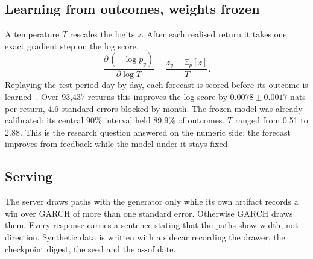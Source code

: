 \documentclass[conference]{IEEEtran}
\begin{document}
\subsection{Learning from outcomes, weights frozen}
\label{sec:online}
A temperature $T$ rescales the logits $z$. After each realised return it takes one exact gradient
step on the log score,
\begin{equation}
\frac{\partial\,(-\log p_y)}{\partial \log T} = \frac{z_y - \mathbb{E}_p[z]}{T}.
\end{equation}
Replaying the test period day by day, each forecast is scored before its outcome is
learned~\cite{Dawid_1984}. Over 93{,}437 returns this improves the log score by
$0.0078 \pm 0.0017$ nats per return, 4.6 standard errors blocked by month. The frozen model was
already calibrated: its central 90\% interval held 89.9\% of outcomes. $T$ ranged from 0.51 to 2.88.
This is the research question answered on the numeric side: the forecast improves from feedback while
the model under it stays fixed.

\subsection{Serving}
The server draws paths with the generator only while its own artifact records a win over GARCH of
more than one standard error. Otherwise GARCH draws them. Every response carries a sentence stating
that the paths show width, not direction. Synthetic data is written with a sidecar recording the
drawer, the checkpoint digest, the seed and the as-of date.
\end{document}
